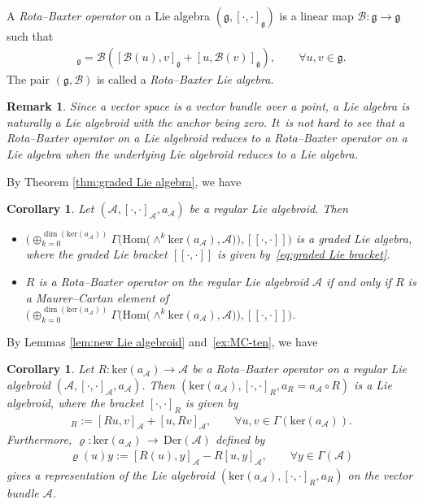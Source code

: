 \documentclass[10pt,a4paper]{amsart}
\numberwithin{equation}{section}
\newtheorem{cor}[thm]{Corollary}
\newtheorem{rmk}[thm]{Remark}
\newcommand{\g}{\mathfrak g}
\newcommand{\huaA}{\mathcal{A}}
\newcommand{\huaB}{\mathcal{B}}
\newcommand{\Courant}[1]{\left[\!\left[ #1\right]\!\right]}
\newcommand{\lon }{\,\rightarrow\,}
\newcommand{\Hom}{\mathrm{Hom}}
\newcommand{\Der}{\mathrm{Der}}
\newcommand{\Ker}{\mathrm{ker}}
\begin{document}
A {\it Rota--Baxter operator} on a Lie algebra $(\g,[\cdot,\cdot]_\g)$ is a linear map $\huaB\colon \g\to \g$ such that
\begin{gather*}
 [\huaB(u),\huaB(v)]_\g=\huaB([\huaB(u),v]_\g+[u,\huaB(v)]_\g),\qquad \forall u,v\in\g.
 \end{gather*}
The pair $(\g,\huaB)$ is called a {\it Rota--Baxter Lie algebra}.
\begin{rmk}
Since a vector space is a vector bundle over a point, a Lie algebra is naturally
a Lie algebroid with the anchor being zero. It~is not hard to see that a Rota--Baxter operator on a Lie algebroid reduces
to a Rota--Baxter operator on a Lie algebra when the underlying Lie algebroid reduces to a Lie algebra.
\end{rmk}



By Theorem \ref{thm:graded Lie algebra}, we have
\begin{cor}
Let $(\huaA,[\cdot,\cdot]_\huaA,a_\huaA)$ be a regular Lie algebroid. Then
\begin{itemize}\itemsep=0pt
 \item[$(i)$] $\bigl(\oplus_{k=0}^{\dim (\Ker(a_\huaA))} \Gamma\big(\Hom\big({\wedge}^{k}\Ker(a_\huaA),\huaA\big)\big),\Courant{\cdot,\cdot}\bigr)$ is a graded Lie algebra, where the graded Lie bracket $\Courant{\cdot,\cdot}$ is given by~\eqref{eq:graded Lie bracket}.
 \item[$(ii)$] $R$ is a Rota--Baxter operator on the regular Lie algebroid $\huaA$ if and only if $R$ is a Maurer--Cartan element of $\bigl(\oplus_{k=0}^{\dim (\Ker(a_\huaA))}\Gamma\big(\Hom\big({\wedge}^{k}\Ker(a_\huaA),\huaA\big)\big),\Courant{\cdot,\cdot}\bigr)$.
\end{itemize}
\end{cor}

By Lemmas \ref{lem:new Lie algebroid} and~\ref{ex:MC-ten}, we have

\begin{cor}
 Let $R\colon \Ker(a_\huaA)\longrightarrow \huaA$ be a Rota--Baxter operator on a regular Lie algebroid $(\huaA,[\cdot,\cdot]_\huaA,a_\huaA)$. Then $(\Ker(a_\huaA),[\cdot,\cdot]_R,a_R=a_\huaA\circ R)$ is a Lie algebroid, where the bracket $[\cdot,\cdot]_R$ is given by
\begin{gather*}
[u,v]_R:=[Ru,v]_\huaA+[u,Rv]_\huaA,\qquad \forall u,v\in\Gamma(\Ker(a_\huaA)).
\end{gather*}
 Furthermore, $ \mathbf{\varrho}\colon \Ker(a_\huaA)\lon\Der(\huaA)$ defined by
 \begin{gather*}
 \varrho(u)y:=[R(u),y]_\huaA-R[u,y]_\huaA, \qquad \forall y\in\Gamma(\huaA)
 \end{gather*}
 gives a representation of the Lie algebroid $(\Ker(a_\huaA),[\cdot,\cdot]_R,a_R)$ on the vector bundle $\huaA$.
\end{cor}
\end{document}
